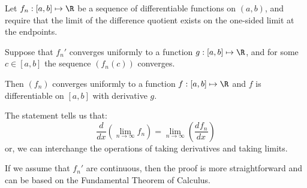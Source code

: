 \documentclass[../Main.tex]{subfiles}
\begin{document}
\begin{theorem}
    Let $f_n : [a, b] \mapsto \R$ be a sequence of differentiable functions on $(a, b)$, and require that the limit of the difference quotient exists on the one-sided limit at the endpoints.

    Suppose that $f_n'$ converges uniformly to a function $g : [a, b] \mapsto \R$, and for some $c \in [a, b]$ the sequence $(f_n(c))$ converges.

    Then $(f_n)$ converges uniformly to a function $f : [a, b] \mapsto \R$ and $f$ is differentiable on $[a, b]$ with derivative $g$.
    \label{thmUCDiff}
\end{theorem}
\begin{remarks}
    \item The statement tells us that:
        \begin{equation*}
            \frac{d}{dx}\left(\lim_{n \to \infty} f_n\right) = \lim_{n \to \infty} \left(\frac{d^{}f_n}{dx^{}}\right)
        \end{equation*}
        or, we can interchange the operations of taking derivatives and taking limits.
    \item If we assume that $f_n'$ are continuous, then the proof is more straightforward and can be based on the Fundamental Theorem of Calculus.
\end{remarks}
\end{document}
